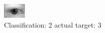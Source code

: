 \begin{figure}[h!]
\begin{center}
\includegraphics[width=0.60\columnwidth]{figures/ID589_class_2_target_3.png}
\end{center}
\caption{ Classification: 2 actual target: 3}
\label{fig:ID589_class_2_target_3}
\end{figure}
